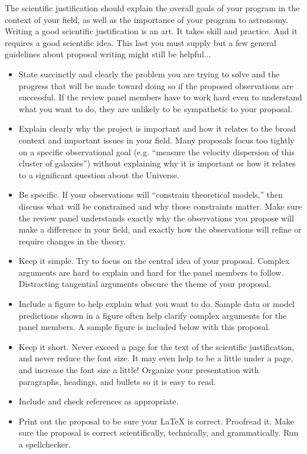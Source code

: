 \sciencejustification
The scientific justification should explain the overall goals of
your program in the context of your field, as well as the importance
of your program to astronomy.
Writing a good scientific justification is an art.  It takes
skill and practice.  And it requires a good scientific idea.
This last you must supply but a few general guidelines
about proposal writing might still be helpful...

\begin{itemize}
\item
State succinctly and clearly the problem you are trying to solve
and the progress that will be made toward doing so if the proposed
observations are successful.  If the review panel members have to work hard
even to understand what you want to do, they are unlikely to be
sympathetic to your proposal.

\item
Explain clearly why the project is important and how it
relates to the broad context and important issues in your field.
Many proposals focus too tightly on a specific observational
goal (e.g. ``measure the velocity dispersion of this cluster of galaxies'')
without explaining why it is important or how it relates to a
significant question about the Universe.

\item
Be specific.  If your observations will ``constrain theoretical
models,'' then discuss what will be constrained and why those
constraints matter.  Make sure the review panel understands exactly why
the observations you propose will make a difference in your field,
and exactly how the observations will refine or
require changes in the theory.

\item
Keep it simple.  Try to focus on the central idea of your proposal.
Complex arguments are hard to explain and hard for the panel members to follow.
Distracting tangential arguments obscure the theme of your proposal.

\item
Include a figure to help explain what you want to do.  Sample
data or model predictions shown in a figure often help clarify
complex arguments for the panel members.  A sample figure is included
below with this proposal.

\item
Keep it short.  Never exceed a page for the text of the scientific
justification, and never reduce the font size.  It may even help to
be a little under a page, and increase the font size a little!
Organize your presentation with paragraphs, headings, and bullets
so it is easy to read.

\item
Include and check references as appropriate.

\item
Print out the proposal to be sure your LaTeX is correct.
Proofread it.  Make sure the proposal is correct scientifically,
technically, and grammatically.  Run a spellchecker.

\end{itemize}

